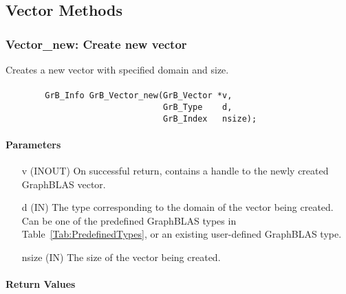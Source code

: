 \subsection{Vector Methods}

\subsubsection{{\sf Vector\_new}: Create new vector}

Creates a new vector with specified domain and size.

\paragraph{\syntax}

\begin{verbatim}
        GrB_Info GrB_Vector_new(GrB_Vector *v,
                                GrB_Type    d,
                                GrB_Index   nsize);
\end{verbatim}

\paragraph{Parameters}

\begin{itemize}[leftmargin=1.1in]
    \item[{\sf v}] ({\sf INOUT}) On successful return, contains a handle
                                 to the newly created GraphBLAS vector.
    \item[{\sf d}] ({\sf IN})    The type corresponding to the domain of the 
                                 vector being created.  Can be one of the 
                                 predefined GraphBLAS types in 
                                 Table~\ref{Tab:PredefinedTypes}, or an existing 
                                 user-defined GraphBLAS type.
    \item[{\sf nsize}] ({\sf IN}) The size of the vector being created.
\end{itemize}

\paragraph{Return Values}

